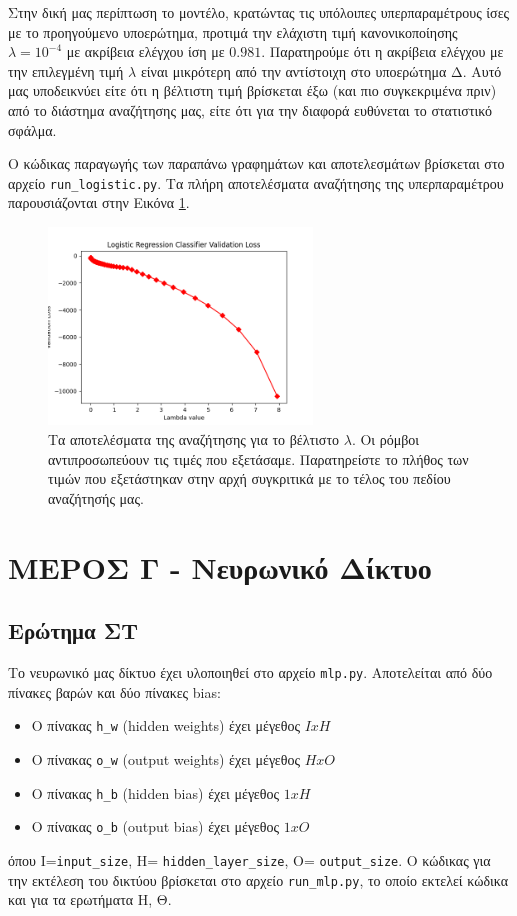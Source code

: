 \documentclass{article}
\newcommand{\code}{\texttt}
\begin{document}
Στην δική μας περίπτωση το μοντέλο, κρατώντας τις υπόλοιπες υπερπαραμέτρους ίσες με το προηγούμενο υποερώτημα, προτιμά την ελάχιστη τιμή κανονικοποίησης \code{$\lambda = 10^{-4}$} με  ακρίβεια ελέγχου ίση με $0.981$. Παρατηρούμε ότι η ακρίβεια ελέγχου με την επιλεγμένη τιμή \code{$\lambda$} είναι μικρότερη από την αντίστοιχη στο υποερώτημα Δ. Αυτό μας υποδεικνύει είτε ότι η βέλτιστη τιμή βρίσκεται έξω (και πιο συγκεκριμένα πριν) από το διάστημα αναζήτησης μας, είτε ότι για την διαφορά ευθύνεται το στατιστικό σφάλμα. \par

Ο κώδικας παραγωγής των παραπάνω γραφημάτων και αποτελεσμάτων βρίσκεται στο αρχείο \code{run\_logistic.py}. Τα πλήρη αποτελέσματα αναζήτησης της υπερπαραμέτρου παρουσιάζονται στην Εικόνα \ref{logistic_lambda_accuracy}.

\begin{figure}
	\includegraphics[width=7cm]{logistic_lambda_accuracy.png}
	\centering
	\caption{ Τα αποτελέσματα της αναζήτησης για το βέλτιστο \code{$\lambda$}. Οι ρόμβοι αντιπροσωπεύουν τις τιμές που εξετάσαμε. Παρατηρείστε το πλήθος των τιμών που εξετάστηκαν στην αρχή συγκριτικά με το τέλος του πεδίου αναζήτησής μας.}
	\label{logistic_lambda_accuracy}
\end{figure}


\section{ΜΕΡΟΣ Γ - Νευρωνικό Δίκτυο}

\subsection{Ερώτημα ΣΤ}

Το νευρωνικό μας δίκτυο έχει υλοποιηθεί στο αρχείο \code{mlp.py}. Αποτελείται από δύο πίνακες βαρών και δύο πίνακες bias:
\begin{itemize}
	\item  Ο πίνακας \code{h\_w} (hidden weights) έχει μέγεθος $IxH$
	\item  Ο πίνακας \code{o\_w} (output weights) έχει μέγεθος $HxO$
	\item  Ο πίνακας \code{h\_b} (hidden bias) έχει μέγεθος $1xH$
	\item  Ο πίνακας \code{o\_b} (output bias) έχει μέγεθος $1xO$
\end{itemize}
όπου I=\code{input\_size}, H= \code{hidden\_layer\_size}, O= \code{output\_size}. Ο κώδικας για την εκτέλεση του δικτύου βρίσκεται στο αρχείο \code{run\_mlp.py}, το οποίο εκτελεί κώδικα και για τα ερωτήματα Η, Θ.
\end{document}

